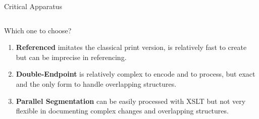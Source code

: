 \begin{frame}{Critical Apparatus}
\begin{columns}
\begin{block}{Which one to choose?}
\begin{enumerate}\footnotesize
    \item \textbf{Referenced} imitates the classical print version, is relatively fast to create but can be imprecise in referencing.
    \item \textbf{Double-Endpoint} is relatively complex to encode and to process, but exact and the only form to handle overlapping structures.
    \item \textbf{Parallel Segmentation} can be easily processed with XSLT but not very flexible in documenting complex changes and overlapping structures.
\end{enumerate}
\end{block}
\end{columns}


\end{frame}

